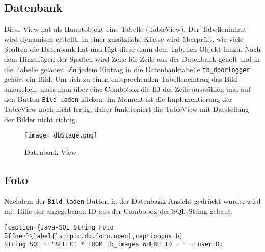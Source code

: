 \subsection{Datenbank}
\label{subsec.datenbank}
Diese View hat als Hauptobjekt eine Tabelle (TableView). Der Tabelleninhalt wird dynamisch erstellt. In einer zusätzliche Klasse wird überprüft, wie viele Spalten die Datenbank hat und fügt diese dann dem Tabellen-Objekt hinzu. Nach dem Hinzufügen der Spalten wird Zeile für Zeile aus der Datenbank geholt und in die Tabelle geladen. Zu jedem Eintrag in die Datenbanktabelle \texttt{tb\_doorlogger} gehört ein Bild. Um sich zu einen entsprechenden Tabelleneintrag das Bild anzusehen, muss man über eine Combobox die ID der Zeile auswählen und auf den Button \texttt{Bild laden} klicken. Im Moment ist die Implementierung der TableView noch nicht fertig, daher funktioniert die TableView mit Darstellung der Bilder nicht richtig. %

\begin{figure}[h]
  \begin{center}
    \texttt{[image: dbStage.png]}
  		  \caption{Datenbank View}
     \label{fig.DatenbankFenster}
  \end{center}
\end{figure}

\subsection{Foto}
\label{subsec.foto}
Nachdem der \texttt{Bild laden} Button in der Datenbank Ansicht gedrückt wurde, wird mit Hilfe der angegebenen ID aus der Combobox der SQL-String gebaut.

\begin{lstlisting}[caption={Java-SQL String Foto öffnen}\label{lst:pic.db.foto.open},captionpos=b]
String SQL = "SELECT * FROM tb_images WHERE ID = " + userID;
\end{lstlisting}

